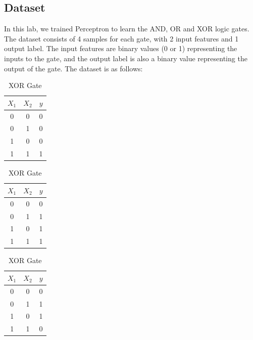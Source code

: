 \documentclass[a4paper, journal]{IEEEtran}
\begin{document}
\subsection*{Dataset}
In this lab, we trained Perceptron to learn the AND, OR and XOR logic gates. The dataset consists of 4 samples for each gate, with 2 input features and 1 output label. The input features are binary values (0 or 1) representing the inputs to the gate, and the output label is also a binary value representing the output of the gate.
The dataset is as follows:
\begin{table}[ht]
    \centering
    \begin{minipage}[t]{0.3\textwidth}
        \centering
        \begin{tabular}{|c|c|c|}
            \hline
            $X_1$ & $X_2$ & $y$ \\
            \hline
            0 & 0 & 0 \\
            0 & 1 & 0 \\
            1 & 0 & 0 \\
            1 & 1 & 1 \\
            \hline
        \end{tabular}
        \caption{AND Gate}
        \label{tab:and_gate}
    \end{minipage}
    \hfill
    \begin{minipage}[t]{0.3\textwidth}
        \centering
        \begin{tabular}{|c|c|c|}
            \hline
            $X_1$ & $X_2$ & $y$ \\
            \hline
            0 & 0 & 0 \\
            0 & 1 & 1 \\
            1 & 0 & 1 \\
            1 & 1 & 1 \\
            \hline
        \end{tabular}
        \caption{OR Gate}
        \label{tab:or_gate}
    \end{minipage}
    \hfill
    \begin{minipage}[t]{0.3\textwidth}
        \centering
        \begin{tabular}{|c|c|c|}
            \hline
            $X_1$ & $X_2$ & $y$ \\
            \hline
            0 & 0 & 0 \\
            0 & 1 & 1 \\
            1 & 0 & 1 \\
            1 & 1 & 0 \\
            \hline
        \end{tabular}
        \caption{XOR Gate}
        \label{tab:xor_gate}
    \end{minipage}
\end{table}
\end{document}
